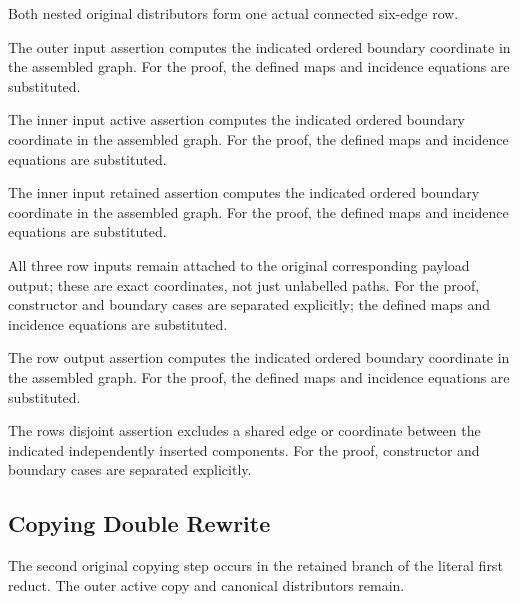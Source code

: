 Both nested original distributors form one actual connected six-edge row.
\par{}

The outer input assertion computes the indicated ordered boundary coordinate in the assembled graph.
For the proof, the defined maps and incidence equations are substituted.
\par{}

The inner input active assertion computes the indicated ordered boundary coordinate in the assembled graph.
For the proof, the defined maps and incidence equations are substituted.
\par{}

The inner input retained assertion computes the indicated ordered boundary coordinate in the assembled graph.
For the proof, the defined maps and incidence equations are substituted.
\par{}

All three row inputs remain attached to the original corresponding payload output; these are exact coordinates, not just unlabelled paths.
For the proof, constructor and boundary cases are separated explicitly; the defined maps and incidence equations are substituted.
\par{}

The row output assertion computes the indicated ordered boundary coordinate in the assembled graph.
For the proof, the defined maps and incidence equations are substituted.
\par{}

The rows disjoint assertion excludes a shared edge or coordinate between the indicated independently inserted components.
For the proof, constructor and boundary cases are separated explicitly.
\par{}

\subsection{Copying Double Rewrite}
The second original copying step occurs in the retained branch of the literal first reduct. The outer active copy and canonical distributors remain.

